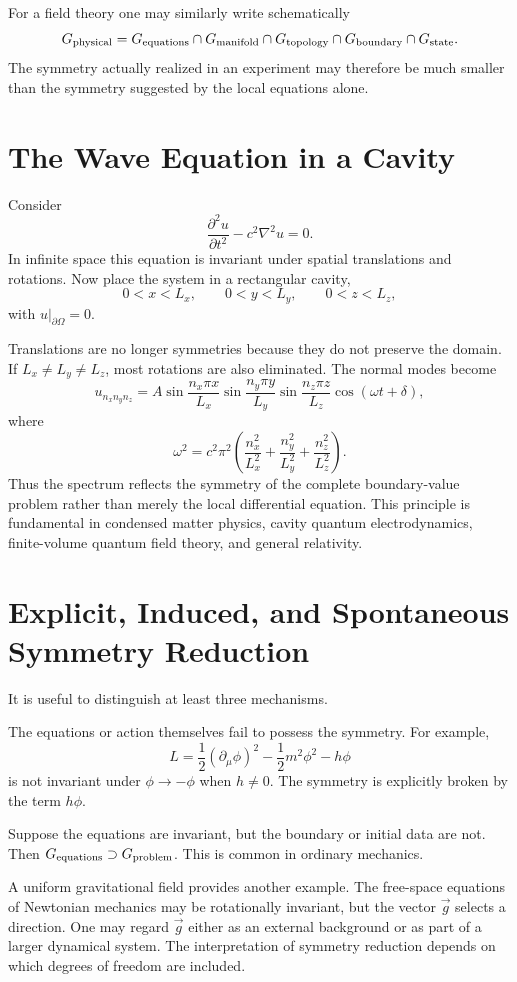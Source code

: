 For a field theory one may similarly write schematically
\[
G_{\rm physical}=
G_{\rm equations}
\cap
G_{\rm manifold}
\cap
G_{\rm topology}
\cap
G_{\rm boundary}
\cap
G_{\rm state}.
\]
The symmetry actually realized in an experiment may therefore be much smaller
than the symmetry suggested by the local equations alone.

\section{ The Wave Equation in a Cavity}
Consider
\[\frac{\partial^2 u}{\partial t^2}-c^2\nabla^2u=0.\]
In infinite space this equation is invariant under spatial translations and 
rotations.
Now place the system in a rectangular cavity,
\[0<x<L_x,\qquad 0<y<L_y,\qquad 0<z<L_z,\]
with $u|_{\partial\Omega}=0$.

Translations are no longer symmetries because they do not preserve the domain.
If $L_x\neq L_y\neq L_z$, most rotations are also eliminated.
The normal modes become
\[u_{n_xn_yn_z}=A\sin\frac{n_x\pi x}{L_x}\sin\frac{n_y\pi y}{L_y}
\sin\frac{n_z\pi z}{L_z}\cos(\omega t+\delta),\]
where
\[\omega^2=c^2\pi^2\left(\frac{n_x^2}{L_x^2}+\frac{n_y^2}{L_y^2}
+\frac{n_z^2}{L_z^2}\right).\]
Thus the spectrum reflects the symmetry of the complete boundary-value problem rather than merely the local differential equation.
This principle is fundamental in condensed matter physics, cavity quantum electrodynamics, finite-volume quantum field theory, and general relativity.

\section{Explicit, Induced, and Spontaneous Symmetry Reduction}
It is useful to distinguish at least three mechanisms.

The equations or action themselves fail to possess the symmetry.
For example,
\[L= \frac{1}{2}(\partial_\mu\phi)^2-\frac{1}{2}m^2\phi^2-h\phi\]
is not invariant under $\phi\rightarrow-\phi$ when $h\neq0$.
The symmetry is explicitly broken by the term $h\phi$.

Suppose the equations are invariant, but the boundary or initial data are not.
Then $G_{\rm equations}\supset G_{\rm problem}$.
This is common in ordinary mechanics.

A uniform gravitational field provides another example.  The free-space
equations of Newtonian mechanics may be rotationally invariant, but the vector
$\vec{g}$ selects a direction.
One may regard $\vec{g}$ either as an external background or as part of a
larger dynamical system.  The interpretation of symmetry reduction depends on
which degrees of freedom are included.

